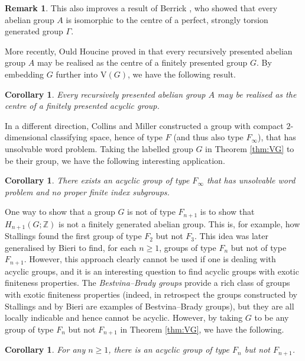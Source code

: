\documentclass[10pt,a4paper]{amsart}
\numberwithin{equation}{section}
\numberwithin{figure}{section}
\newtheorem{cor}[thm]{Corollary}
\theoremstyle{definition}
\newtheorem{rem}[thm]{Remark}
\newcommand{\bZ}{\mathbb{Z}}
\newcommand{\V}{\mathrm{V}}
\renewcommand{\geq}{\geqslant}
\begin{document}
\begin{rem}
This also improves a result of Berrick \cite[Theorem A]{Berrick91}, who showed that every abelian group $A$ is isomorphic to the centre of a perfect, strongly torsion generated group $\Gamma$.
\end{rem}

More recently, Ould Houcine proved in \cite{Ould07} that every recursively presented abelian group $A$ may be realised as the centre of a finitely presented group $G$. By embedding $G$ further into $\V(G)$, we have the following result.

\begin{cor}
Every recursively presented abelian group $A$ may be realised as the centre of a finitely presented acyclic group.
\end{cor}

In a different direction, Collins and Miller \cite{CollinsMiller99} constructed a group with compact $2$-dimensional classifying space, hence of type $F$ (and thus also type $F_\infty$), that has unsolvable word problem. Taking the labelled group $G$ in Theorem \ref{thm:VG} to be their group, we have the following interesting application. 

\begin{cor}
There exists an acyclic group of type $F_\infty$ that has unsolvable word problem and no proper finite index subgroups.
\end{cor}

One way to show that a group $G$ is not of type $F_{n+1}$ is to show that $H_{n+1}(G;\bZ)$ is not a finitely generated abelian group. This is, for example, how Stallings \cite{Stallings63} found the first group of type $F_2$ but not $F_3$. This idea was later generalised by Bieri \cite[Proposition 4.1]{Bieri76} to find, for each $n\geq 1$, groups of type $F_n$ but not of type $F_{n+1}$. However, this approach clearly cannot be used if one is dealing with acyclic groups, and it is an interesting question to find acyclic groups with exotic finiteness properties. The \emph{Bestvina--Brady groups} \cite{BestvinaBrady97} provide a rich class of groups with exotic finiteness properties (indeed, in retrospect the groups constructed by Stallings and by Bieri are examples of Bestvina--Brady groups), but they are all locally indicable and hence cannot be acyclic. However, by taking $G$ to be any group of type $F_n$ but not $F_{n+1}$ in Theorem \ref{thm:VG}, we have the following.

\begin{cor}
\label{cor:acyc-Fn-nFn+1}
For any $n\geq 1$, there is an acyclic group of type $F_n$ but not $F_{n+1}$.
\end{cor}
\end{document}
